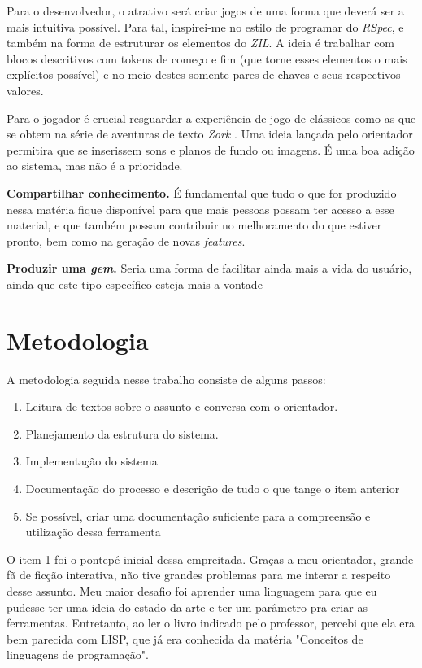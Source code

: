 Para o desenvolvedor, o atrativo será criar jogos de uma forma que deverá ser a mais intuitiva possível.
Para tal, inspirei-me no estilo de programar do \emph{RSpec}, e também na forma de estruturar os elementos
do \emph{ZIL}. A ideia é trabalhar com blocos descritivos com tokens de começo e fim (que torne esses
elementos o mais explícitos possível) e no meio destes somente pares de chaves e seus respectivos valores.

Para o jogador é crucial resguardar a experiência de jogo de clássicos como as que se obtem na série de
aventuras de texto \emph{Zork} \citep{Zork}. Uma ideia lançada pelo orientador permitira que se inserissem
sons e planos de fundo ou imagens. É uma boa adição ao sistema, mas não é a prioridade.

\textbf{Compartilhar conhecimento.} É fundamental que tudo o que for produzido nessa matéria fique disponível
para que mais pessoas possam ter acesso a esse material, e que também possam contribuir no melhoramento do
que estiver pronto, bem como na geração de novas \emph{features}.

\textbf{Produzir uma \emph{gem}.} Seria uma forma de facilitar ainda mais a vida do usuário, ainda que este tipo
específico esteja mais a vontade

\section{Metodologia}
\label{sec:methodology}

A metodologia seguida nesse trabalho consiste de alguns passos: \begin{enumerate}
  \item Leitura de textos sobre o assunto e conversa com o orientador.
  \item Planejamento da estrutura do sistema.
  \item Implementação do sistema
  \item Documentação do processo e descrição de tudo o que tange o item anterior
  \item Se possível, criar uma documentação suficiente para a compreensão e utilização dessa ferramenta
\end{enumerate}

O item 1 foi o pontepé inicial dessa empreitada. Graças a meu orientador, grande fã de ficção interativa, não tive
grandes problemas para me interar a respeito desse assunto. Meu maior desafio foi aprender uma linguagem para que
eu pudesse ter uma ideia do estado da arte e ter um parâmetro pra criar as ferramentas. Entretanto, ao ler o livro
\citet{Zil:95} indicado pelo professor, percebi que ela era bem parecida com LISP, que já era conhecida da matéria
"Conceitos de linguagens de programação".

